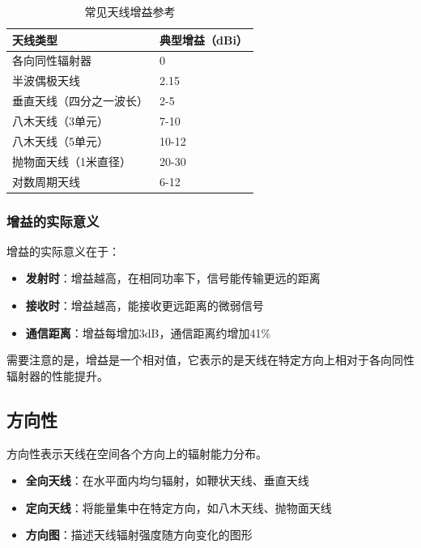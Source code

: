 \begin{table}[htbp]
    \centering
    \small
    \caption{常见天线增益参考}
    \begin{tabular}{|p{3.5cm}|p{2cm}|}
        \hline
        \textbf{天线类型} & \textbf{典型增益（dBi）} \\
        \hline
        各向同性辐射器 & 0 \\
        \hline
        半波偶极天线 & 2.15 \\
        \hline
        垂直天线（四分之一波长） & 2-5 \\
        \hline
        八木天线（3单元） & 7-10 \\
        \hline
        八木天线（5单元） & 10-12 \\
        \hline
        抛物面天线（1米直径） & 20-30 \\
        \hline
        对数周期天线 & 6-12 \\
        \hline
    \end{tabular}
\end{table}

\subsubsection{增益的实际意义}

增益的实际意义在于：

\begin{itemize}
    \item \textbf{发射时}：增益越高，在相同功率下，信号能传输更远的距离
    \item \textbf{接收时}：增益越高，能接收更远距离的微弱信号
    \item \textbf{通信距离}：增益每增加3dB，通信距离约增加41\%
\end{itemize}

需要注意的是，增益是一个相对值，它表示的是天线在特定方向上相对于各向同性辐射器的性能提升。

\subsection{方向性}
\label{sec:directivity}

方向性表示天线在空间各个方向上的辐射能力分布。

\begin{itemize}
    \item \textbf{全向天线}：在水平面内均匀辐射，如鞭状天线、垂直天线
    \item \textbf{定向天线}：将能量集中在特定方向，如八木天线、抛物面天线
    \item \textbf{方向图}：描述天线辐射强度随方向变化的图形
\end{itemize}

